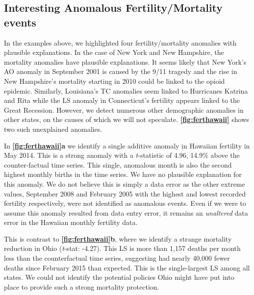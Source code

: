 \documentclass[12pt]{article}
\begin{document}
\hypertarget{interesting-anomalous-fertilitymortality-events}{%
\subsection{Interesting Anomalous Fertility/Mortality
events}\label{interesting-anomalous-fertilitymortality-events}}

In the examples above, we highlighted four fertility/mortality anomalies
with plausible explanations. In the case of New York and New Hampshire,
the mortality anomalies have plausible explanations. It seems likely
that New York's AO anomaly in September 2001 is caused by the 9/11
tragedy and the rise in New Hampshire's mortality starting in 2010 could
be linked to the opioid epidemic. Similarly, Louisiana's TC anomalies
seem linked to Hurricanes Katrina and Rita while the LS anomaly in
Connecticut's fertility appears linked to the Great Recession. However,
we detect numerous other demographic anomalies in other states, on the
causes of which we will not speculate. \textbf{\autoref{fig:ferthawaii}}
shows two such unexplained anomalies.

In \textbf{\autoref{fig:ferthawaii}a} we identify a single additive
anomaly in Hawaiian fertility in May 2014. This is a strong anomaly with
a \emph{t}-statistic of 4.96, 14.9\% above the counter-factual time
series. This single, anomalous month is also the second highest monthly
births in the time series. We have no plausible explanation for this
anomaly. We do not believe this is simply a data error as the other
extreme values, September 2008 and February 2005 with the highest and
lowest recorded fertility respectively, were not identified as anomalous
events. Even if we were to assume this anomaly resulted from data entry
error, it remains an \emph{unaltered} data error in the Hawaiian monthly
fertility data.

This is contrast to \textbf{\autoref{fig:ferthawaii}b}, where we
identify a strange mortality reduction in Ohio (\emph{t}-stat: -4.27).
This LS is more than 1,157 deaths per month less than the counterfactual
time series, suggesting had nearly 40,000 fewer deaths since February
2015 than expected. This is the single-largest LS among all states. We
could not identify the potential policies Ohio might have put into place
to provide such a strong mortality protection.
\end{document}

